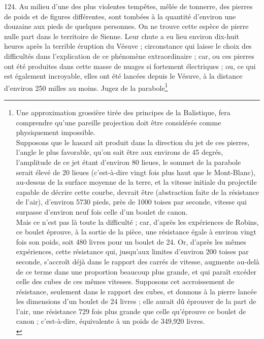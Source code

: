 \documentclass[a4paper, 11pt, oneside, polutonikogreek, french]{article}
\begin{document}
124. \og Au milieu d'une des plus violentes tempêtes, mêlée de tonnerre, des pierres de poids et de figures différentes, sont tombées à la quantité d'environ une douzaine aux pieds de quelques personnes. On ne trouve cette espèce de pierre nulle part dans le territoire de Sienne. Leur chute a eu lieu environ dix-huit heures après la terrible éruption du Vésuve ; circonstance qui laisse le choix des difficultés dans l'explication de ce phénomène extraordinaire ; car, ou ces pierres ont été produites dans cette masse de nuages si fortement électriques ; ou, ce qui est également incroyable, elles ont été lancées depuis le Vésuve, à la distance d'environ 250 milles au moins. Jugez de la parabole\footnote{Une approximation grossière tirée des principes de la Balistique, fera comprendre qu'une pareille projection doit être considérée comme physiquement impossible.\\
\hspace*{5mm}Supposons que le hasard ait produit dans la direction du jet de ces pierres, l'angle le plus favorable, qu'on sait être aux environs de 45 degrés, l'amplitude de ce jet étant d'environ 80 lieues, le sommet de la parabole serait élevé de 20 lieues (c'est-à-dire vingt fois plus haut que le Mont-Blanc), au-dessus de la surface moyenne de la terre, et la vitesse initiale du projectile capable de décrire cette courbe, devrait être (abstraction faite de la résistance de l'air), d'environ 5730 pieds, près de 1000 toises par seconde, vitesse qui surpasse d'environ neuf fois celle d'un boulet de canon.\\
Mais ce n'est pas là toute la difficulté ; car, d'après les expériences de Robins, ce boulet éprouve, à la sortie de la pièce, une résistance égale à environ vingt fois son poids, soit 480 livres pour un boulet de 24. Or, d'après les mêmes expériences, cette résistance qui, jusqu'aux limites d'environ 200 toises par seconde, s'accroît déjà dans le rapport des carrés de vitesse, augmente au-delà de ce terme dans une proportion beaucoup plus grande, et qui paraît excéder celle des cubes de ces mêmes vitesses. Supposons cet accroissement de résistance, seulement dans le rapport des cubes, et donnons à la pierre lancée les dimensions d'un boulet de 24 livres ; elle aurait dû éprouver de la part de l'air, une résistance 729 fois plus grande que celle qu'éprouve ce boulet de canon ; c'est-à-dire, équivalente à un poids de 349,920 livres.\\
}
\end{document}
